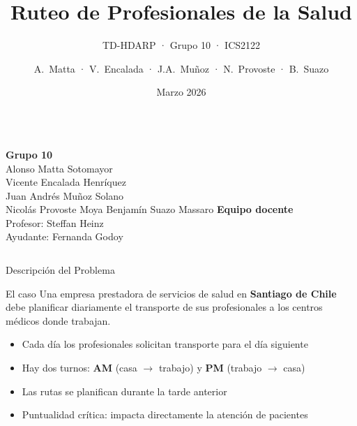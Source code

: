 \documentclass[10pt, aspectratio=169]{beamer}
\title{Ruteo de Profesionales de la Salud}
\subtitle{TD-HDARP · Grupo 10 · ICS2122}
\author{A.~Matta · V.~Encalada · J.A.~Muñoz · N.~Provoste · B.~Suazo}
\institute{Pontificia Universidad Católica de Chile}
\date{Marzo 2026}
\begin{document}
\begin{frame}
  \titlepage
  \vspace{-0.8em}
  \begin{columns}[T]
      \footnotesize\textbf{Grupo 10}\\[3pt]
      Alonso Matta Sotomayor\\
      Vicente Encalada Henríquez\\
      Juan Andrés Muñoz Solano\\
      Nicolás Provoste Moya \quad Benjamín Suazo Massaro
      \footnotesize\textbf{Equipo docente}\\[3pt]
      Profesor: Steffan Heinz\\
      Ayudante: Fernanda Godoy
  \end{columns}
\end{frame}

\begin{frame}{Descripción del Problema}

  \begin{block}{El caso}
    Una empresa prestadora de servicios de salud en \textbf{Santiago de Chile} debe planificar diariamente el transporte de sus profesionales a los centros médicos donde trabajan.
  \end{block}

  \vspace{12pt}
  \begin{itemize}\setlength\itemsep{10pt}
    \item Cada día los profesionales solicitan transporte para el día siguiente
    \item Hay dos turnos: \textcolor{verdeok}{\bfseries AM} (casa $\to$ trabajo) y \textcolor{rojono}{\bfseries PM} (trabajo $\to$ casa)
    \item Las rutas se planifican durante la tarde anterior
    \item Puntualidad crítica: impacta directamente la atención de pacientes
  \end{itemize}

\end{frame}
\end{document}
